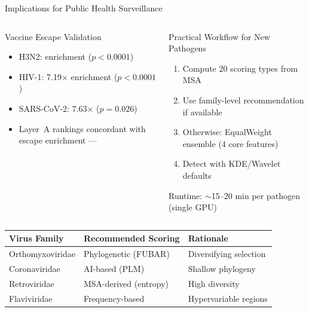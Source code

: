 \begin{frame}{Implications for Public Health Surveillance}
  \begin{columns}[T]
    \begin{block}{Vaccine Escape Validation}
      \begin{itemize}
        \item H3N2:  enrichment ($p < 0.0001$)
        \item HIV-1: 7.19$\times$ enrichment ($p < 0.0001$)
        \item SARS-CoV-2: 7.63$\times$ ($p = 0.026$)
        \item Layer~A rankings concordant with escape enrichment --- 
      \end{itemize}
    \end{block}

    \begin{block}{Practical Workflow for New Pathogens}
      \begin{enumerate}
        \item Compute 20 scoring types from MSA
        \item Use family-level recommendation if available
        \item Otherwise: EqualWeight ensemble (4 core features)
        \item Detect with KDE/Wavelet defaults
      \end{enumerate}
      \vspace{0.3em}
      {\footnotesize Runtime: $\sim$15--20 min per pathogen (single GPU)}
    \end{block}
  \end{columns}

  \vspace{0.5em}
  \centering
  \begin{tabular}{lll}
    \toprule
    \textbf{Virus Family} & \textbf{Recommended Scoring} & \textbf{Rationale} \\
    \midrule
    Orthomyxoviridae & Phylogenetic (FUBAR) & Diversifying selection \\
    Coronaviridae    & AI-based (PLM)       & Shallow phylogeny \\
    Retroviridae     & MSA-derived (entropy) & High diversity \\
    Flaviviridae     & Frequency-based       & Hypervariable regions \\
    \bottomrule
  \end{tabular}
\end{frame}

